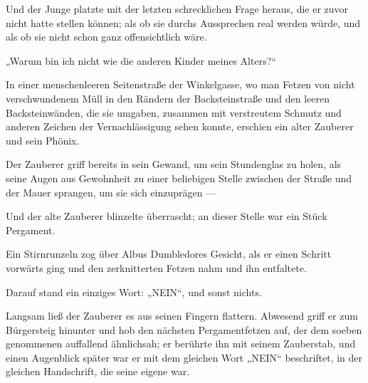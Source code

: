 Und der Junge platzte mit der letzten schrecklichen Frage heraus, die er zuvor nicht hatte stellen können; als ob sie durchs Aussprechen real werden würde, und als ob sie nicht schon ganz offensichtlich wäre.

„Warum bin ich nicht wie die anderen Kinder meines Alters?“

\later

In einer menschenleeren Seitenstraße der Winkelgasse, wo man Fetzen von nicht verschwundenem Müll in den Rändern der Backsteinstraße und den leeren Backsteinwänden, die sie umgaben, zusammen mit verstreutem Schmutz und anderen Zeichen der Vernachlässigung sehen konnte, erschien ein alter Zauberer und sein Phönix.

Der Zauberer griff bereits in sein Gewand, um sein Stundenglas zu holen, als seine Augen aus Gewohnheit zu einer beliebigen Stelle zwischen der Straße und der Mauer sprangen, um sie sich einzuprägen —

Und der alte Zauberer blinzelte überrascht; an dieser Stelle war ein Stück Pergament.

Ein Stirnrunzeln zog über Albus Dumbledores Gesicht, als er einen Schritt vorwärts ging und den zerknitterten Fetzen nahm und ihn entfaltete.

Darauf stand ein einziges Wort:
„NEIN“, und sonst nichts.

Langsam ließ der Zauberer es aus seinen Fingern flattern. Abwesend griff er zum Bürgersteig hinunter und hob den nächsten Pergamentfetzen auf, der dem soeben genommenen auffallend ähnlichsah; er berührte ihn mit seinem Zauberstab, und einen Augenblick später war er mit dem gleichen Wort
„NEIN“ beschriftet, in der gleichen Handschrift, die seine eigene war.

